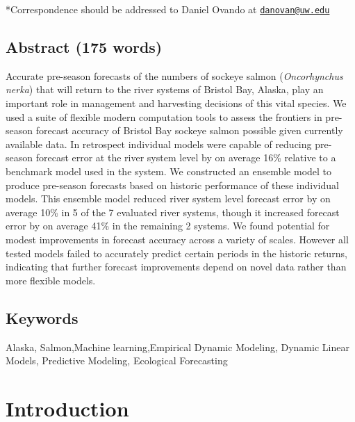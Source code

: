 \documentclass[
]{article}
\begin{document}
*Correspondence should be addressed to Daniel Ovando at \href{mailto:danovan@uw.edu}{\nolinkurl{danovan@uw.edu}}

\newpage

\hypertarget{abstract-175-words}{%
\subsection*{Abstract (175 words)}\label{abstract-175-words}}

Accurate pre-season forecasts of the numbers of sockeye salmon (\emph{Oncorhynchus nerka}) that will return to the river systems of Bristol Bay, Alaska, play an important role in management and harvesting decisions of this vital species. We used a suite of flexible modern computation tools to assess the frontiers in pre-season forecast accuracy of Bristol Bay sockeye salmon possible given currently available data. In retrospect individual models were capable of reducing pre-season forecast error at the river system level by on average 16\% relative to a benchmark model used in the system. We constructed an ensemble model to produce pre-season forecasts based on historic performance of these individual models. This ensemble model reduced river system level forecast error by on average 10\% in 5 of the 7 evaluated river systems, though it increased forecast error by on average 41\% in the remaining 2 systems. We found potential for modest improvements in forecast accuracy across a variety of scales. However all tested models failed to accurately predict certain periods in the historic returns, indicating that further forecast improvements depend on novel data rather than more flexible models.

\hypertarget{keywords}{%
\subsection*{Keywords}\label{keywords}}

Alaska, Salmon,Machine learning,Empirical Dynamic Modeling, Dynamic Linear Models, Predictive Modeling, Ecological Forecasting

\newpage

\hypertarget{introduction}{%
\section*{Introduction}\label{introduction}}
\end{document}
